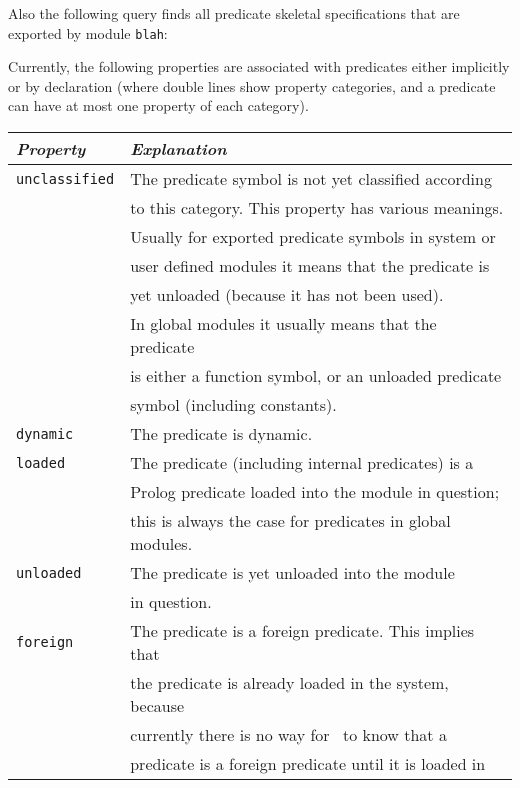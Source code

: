 \begin{description}
    Also the following query finds all predicate skeletal specifications that 
    are exported by module {\tt blah}:


    Currently, the following properties are associated with predicates 
    either implicitly or by declaration (where double lines show property
    categories, and a predicate can have at most one property of each
    category).

    \begin{center}
    \begin{tabular}{||l|l||}               \hline 
	{\em Property}		& {\em Explanation} \\ \hline \hline
	{\tt unclassified}	& 
		The predicate symbol is not yet classified according  \\
	&	to this category. This property has various meanings. \\ 
	&	Usually for exported predicate symbols in system or   \\
	&	user defined modules it means that the predicate is   \\
	&	yet unloaded (because it has not been used).	      \\
	&	In global modules it usually means that the predicate \\
	&	is either a function symbol, or an unloaded predicate \\
	&	symbol (including constants). \\ \hline
	{\tt dynamic}	& 
		The predicate is dynamic. \\ \hline
	{\tt loaded}		& 
		The predicate (including internal predicates) is a \\ 
	&	Prolog predicate loaded into the module in question; \\
	&	this is always the case for predicates in global modules.\\ 
		\hline
	{\tt unloaded}		& 
		The predicate is yet unloaded into the module \\
	&	in question.\\ \hline
	{\tt foreign}	& 
		The predicate is a foreign predicate. This implies that  \\ 
	&	the predicate is already loaded in the system, because	 \\
	&	currently there is no way for \ourprolog\ to know that a \\
	&	predicate is a foreign predicate until it is loaded in	 \\

\end{tabular}
\end{center}
\end{description}
